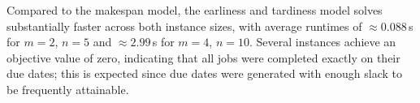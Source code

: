 \documentclass{article}
\begin{document}
Compared to the makespan model, the earliness and tardiness model solves substantially faster across both instance sizes, with average runtimes of $\approx 0.088$\,s for $m=2$, $n=5$ and $\approx 2.99$\,s for $m=4$, $n=10$. Several instances achieve an objective value of zero, indicating that all jobs were completed exactly on their due dates; this is expected since due dates were generated with enough slack to be frequently attainable. 


\end{document}
